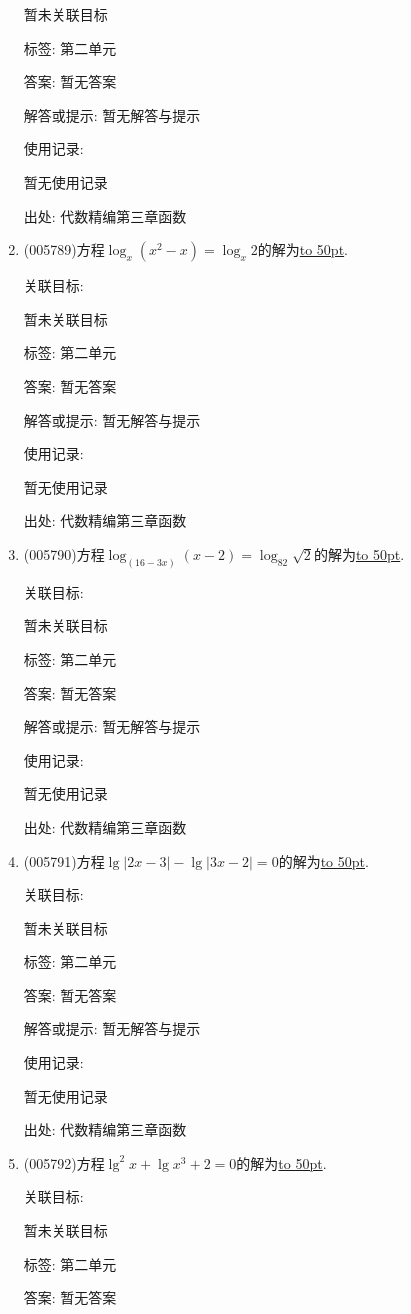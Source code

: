 \documentclass[10pt,a4paper]{article}
\newcommand{\blank}[1]{\underline{\hbox to #1pt{}}}
\begin{document}
\begin{enumerate}[1.]
暂未关联目标



标签: 第二单元

答案: 暂无答案

解答或提示: 暂无解答与提示

使用记录:

暂无使用记录


出处: 代数精编第三章函数
\item { (005789)}方程$\log_x(x^2-x)=\log_x2$的解为\blank{50}.


关联目标:

暂未关联目标



标签: 第二单元

答案: 暂无答案

解答或提示: 暂无解答与提示

使用记录:

暂无使用记录


出处: 代数精编第三章函数
\item { (005790)}方程$\log_{(16-3x)}(x-2)=\log_82\sqrt 2$的解为\blank{50}.


关联目标:

暂未关联目标



标签: 第二单元

答案: 暂无答案

解答或提示: 暂无解答与提示

使用记录:

暂无使用记录


出处: 代数精编第三章函数
\item { (005791)}方程$\lg|2x-3|-\lg|3x-2|=0$的解为\blank{50}.


关联目标:

暂未关联目标



标签: 第二单元

答案: 暂无答案

解答或提示: 暂无解答与提示

使用记录:

暂无使用记录


出处: 代数精编第三章函数
\item { (005792)}方程$\lg ^2x+\lg x^3+2=0$的解为\blank{50}.


关联目标:

暂未关联目标



标签: 第二单元

答案: 暂无答案


\end{enumerate}
\end{document}
